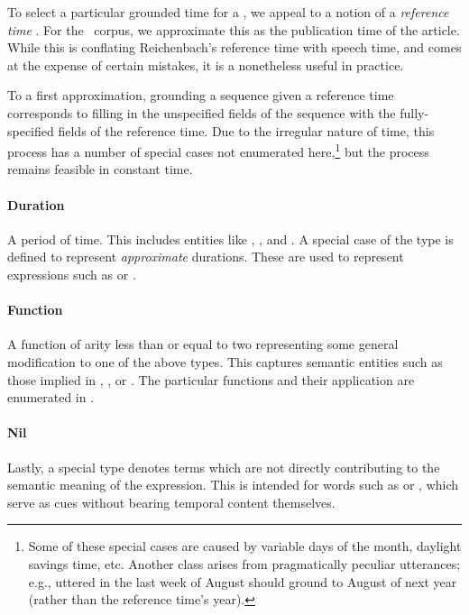 To select a particular grounded time for a , 
  we appeal to a notion of a
  \textit{reference time} \cite{key:1947reichenback-temporal}.
For the \tempeval\ corpus, we approximate this as the
	publication time of the article.
While this is conflating Reichenbach's reference time with speech time, 
  and comes at the expense of certain mistakes,
	it is a nonetheless useful in practice.

To a first approximation, grounding a sequence given a reference time
  corresponds to filling in the unspecified fields of the sequence with the
  fully-specified fields of the reference time.
Due to the irregular nature of time, this process has a number of special
  cases not enumerated here,\footnote{
    Some of these special cases are caused by variable days of the month,
      daylight savings time, etc.
    Another class arises from pragmatically peculiar utterances; e.g.,
       uttered in the last week of August
      should ground to August of next year (rather than the reference time's
      year).
  }
  but the process remains feasible in constant time.
	
\paragraph{Duration}
A period of time.
This includes entities like , , and .
A special case of the  type is defined to represent 
	\textit{approximate} durations.
These are used to represent expressions such as  or
	.

\paragraph{Function}
A function of arity less than or equal to two representing some
	general modification to one of the above types.
This captures semantic entities such as those implied in
	, 
	, or .
The particular functions and their application are enumerated in 
	.

\paragraph{Nil}
Lastly, a special  type denotes terms which are not
	directly contributing to the semantic meaning of the expression.
This is intended for words such as  or , which serve as cues
	without bearing temporal content themselves.


